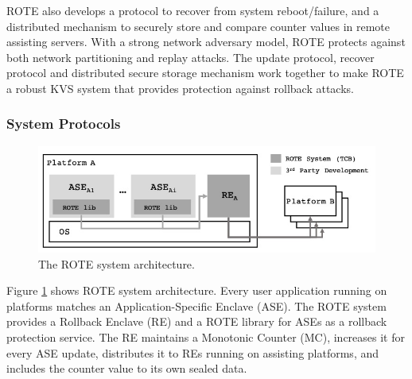 ROTE also develops a protocol to recover from system reboot/failure, and a distributed 
mechanism to securely store and compare counter values in remote assisting servers.
With a strong network adversary model, ROTE protects
against both network partitioning and replay attacks. The update protocol, 
recover protocol and distributed secure storage mechanism work together to make ROTE 
a robust KVS system that provides protection against rollback attacks.



\subsubsection{System Protocols}
\begin{figure}
    \centering
        \includegraphics[width=.45\textwidth]{rote_sys}
        \caption[title]{The ROTE system architecture.}
        \label{fig:rote_sys}
\end{figure}

Figure \ref{fig:rote_sys} shows ROTE system architecture. Every user application running on platforms matches an Application-Specific Enclave (ASE). The ROTE system provides a Rollback Enclave (RE) and a ROTE library for ASEs as a rollback protection service. The RE maintains a Monotonic Counter (MC), increases it for every ASE update, distributes it to REs running on assisting platforms, and includes the counter value to its own sealed data. 

